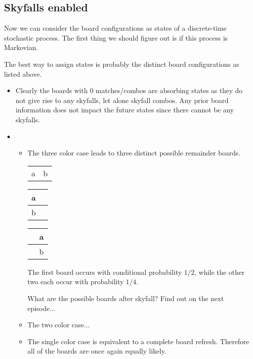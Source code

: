 \documentclass[12pt]{article}
\begin{document}
\subsection{Skyfalls enabled}
Now we can consider the board configurations as states of a discrete-time stochastic process. The first thing we should figure out is if this process is Markovian.

The best way to assign states is probably the distinct board configurations as listed above.

\begin{itemize}
    \item Clearly the boards with 0 matches/combos are absorbing states as they do not give rise to any skyfalls, let alone skyfall combos. Any prior board information does not impact the future states since there cannot be any skyfalls.
    \item 
    \begin{itemize}
        \item The three color case leads to three distinct possible remainder boards.
        \begin{center}
            \begin{tabular}{|c|c|}
            \hline
             &  \\
            \hline
            a & b \\
            \hline
            \end{tabular}
            \qquad
            \begin{tabular}{|c|c|}
            \hline
            a & \phantom{a} \\
            \hline
            b & \phantom{a} \\
            \hline
            \end{tabular}
            \qquad
            \begin{tabular}{|c|c|}
            \hline
            \phantom{a} & a \\
            \hline
            \phantom{a} & b \\
            \hline
            \end{tabular}
        \end{center}
        The first board occurs with conditional probability $1/2$, while the other two each occur with probability $1/4$.
        
        What are the possible boards after skyfall? Find out on the next episode...
        \item 
        The two color case...
        \item The single color case is equivalent to a complete board refresh. Therefore all of the boards are once again equally likely.
    \end{itemize}
\end{itemize}
\end{document}
